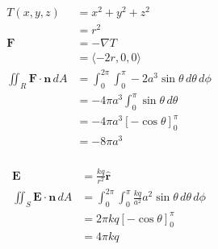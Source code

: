 \documentclass{article}
\begin{document}
\setcounter{subsubsection}{36}
\subsubsection{}

\begin{align*}
  T(x, y, z)                               & = x^2 + y^2 + z^2                                                \\
                                           & = r^2                                                            \\
  \mathbf{F}                               & = -\nabla T                                                      \\
                                           & = \langle -2 r, 0, 0 \rangle                                     \\
  \iint_R \mathbf{F} \cdot \mathbf{n} \,dA & = \int_0^{2 \pi} \int_0^\pi -2 a^3 \sin \theta \,d\theta \,d\phi \\
                                           & = -4 \pi a^3 \int_0^\pi \sin \theta \,d\theta                    \\
                                           & = -4 \pi a^3 [-\cos \theta]_0^\pi                                \\
                                           & = -8 \pi a^3
\end{align*}

\setcounter{subsubsection}{38}
\subsubsection{}

\begin{align*}
  \mathbf{E}                               & = \frac{k q}{r^2} \hat{\mathbf{r}}                                            \\
  \iint_S \mathbf{E} \cdot \mathbf{n} \,dA & = \int_0^{2 \pi} \int_0^\pi \frac{k q}{a^2} a^2 \sin \theta \,d\theta \,d\phi \\
                                           & = 2 \pi k q [-\cos \theta]_0^\pi                                              \\
                                           & = 4 \pi k q
\end{align*}
\end{document}
